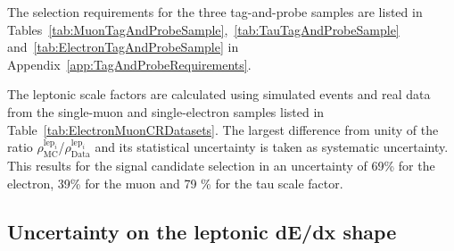 The selection requirements for the three tag-and-probe samples are listed in Tables~\ref{tab:MuonTagAndProbeSample},~\ref{tab:TauTagAndProbeSample} and~\ref{tab:ElectronTagAndProbeSample} in Appendix~\ref{app:TagAndProbeRequirements}.

The leptonic scale factors are calculated using simulated \Zlep events and real data from the single-muon and single-electron samples listed in Table~\ref{tab:ElectronMuonCRDatasets}.
The largest difference from unity of the ratio $\rho^{\text{lep}_i}_{\text{MC}}$/$\rho^{\text{lep}_i}_{\text{Data}}$ and its statistical uncertainty is taken as systematic uncertainty. 
This results for the signal candidate selection in an uncertainty of 69\% for the electron, 39\% for the muon and 79 \% for the tau scale factor.

\subsection{Uncertainty on the leptonic dE/dx shape}
\label{sec:LeptonIasUncertainty}

